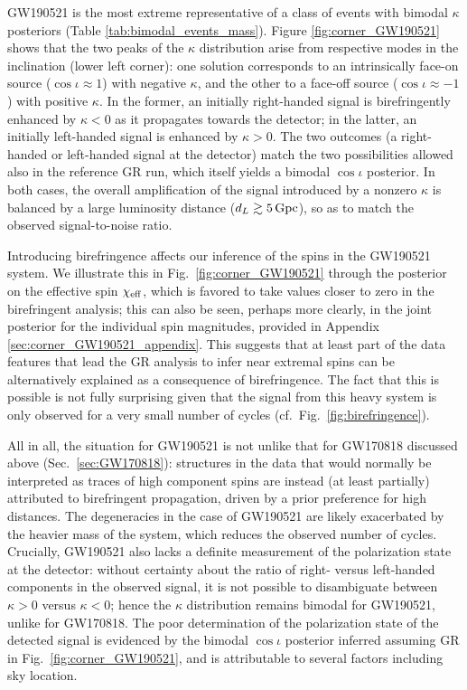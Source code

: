 \documentclass[aps,prd,twocolumn,superscriptaddress,preprintnumbers,nofootinbib]{revtex4-2}
\begin{document}
GW190521 is the most extreme representative of a class of events with bimodal $\kappa$ posteriors (Table \ref{tab:bimodal_events_mass}).
Figure \ref{fig:corner_GW190521} shows that the two peaks of the $\kappa$ distribution arise from respective modes in the inclination (lower left corner): one solution corresponds to an intrinsically face-on source ($\cos\iota \approx 1$) with negative $\kappa$, and the other to a face-off source ($\cos\iota \approx -1$) with positive $\kappa$.
In the former, an initially right-handed signal is birefringently enhanced by $\kappa < 0$ as it propagates towards the detector; in the latter, an initially left-handed signal is enhanced by $\kappa > 0$.
The two outcomes (a right-handed or left-handed signal at the detector) match the two possibilities allowed also in the reference \ac{GR} run, which itself yields a bimodal $\cos\iota$ posterior.
In both cases, the overall amplification of the signal introduced by a nonzero $\kappa$ is balanced by a large luminosity distance ($d_L \gtrsim 5 \, {\rm Gpc}$), so as to match the observed signal-to-noise ratio.

Introducing birefringence affects our inference of the spins in the GW190521 system.
We illustrate this in Fig.~\ref{fig:corner_GW190521} through the posterior on the effective spin $\chi_{\rm eff}$, which is favored to take values closer to zero in the birefringent analysis;
this can also be seen, perhaps more clearly, in the joint posterior for the individual spin magnitudes, provided in Appendix \ref{sec:corner_GW190521_appendix}.
This suggests that at least part of the data features that lead the \ac{GR} analysis to infer near extremal spins can be alternatively explained as a consequence of birefringence.
The fact that this is possible is not fully surprising given that the signal from this heavy system is only observed for a very small number of cycles \cite{LIGOScientific:2020iuh,LIGOScientific:2020ufj} (cf.~Fig.~\ref{fig:birefringence}).

All in all, the situation for GW190521 is not unlike that for GW170818 discussed above (Sec.~\ref{sec:GW170818}): structures in the data that would normally be interpreted as traces of high component spins are instead (at least partially) attributed to birefringent propagation, driven by a prior preference for high distances.
The degeneracies in the case of GW190521 are likely exacerbated by the heavier mass of the system, which reduces the observed number of cycles.
Crucially, GW190521 also lacks a definite measurement of the polarization state at the detector: without certainty about the ratio of right- versus left-handed components in the observed signal, it is not possible to disambiguate between $\kappa > 0$ versus $\kappa < 0$; hence the $\kappa$ distribution remains bimodal for GW190521, unlike for GW170818.
The poor determination of the polarization state of the detected signal is evidenced by the bimodal $\cos\iota$ posterior inferred assuming \ac{GR} in Fig.~\ref{fig:corner_GW190521}, and is attributable to several factors including sky location.
\end{document}
